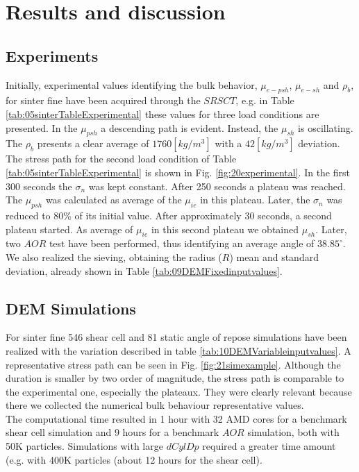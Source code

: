 \section{Results and discussion}
\label{sec:results}

\subsection{Experiments}
\label{subsec:experiments}

Initially, experimental values identifying the bulk behavior, $\mu_{e-psh}$, $\mu_{e-sh}$ and $\rho_{b}$, 
for sinter fine have been acquired through the $SRSCT$, e.g. in Table
\ref{tab:05sinterTableExperimental}
these values for three load conditions are presented.
In the $\mu_{psh}$ a descending path is evident. 
Instead, the $\mu_{sh}$ is oscillating.
The $\rho_b$ presents a clear average of $1760 [kg/m^3]$ with a $42 [kg/m^3]$
deviation.
The stress path for the second load condition of Table
\ref{tab:05sinterTableExperimental} is shown in Fig.
\ref{fig:20experimental}.
In the first 300 seconds the $\sigma_n$ was kept constant. After 250 seconds a
plateau was reached. 
The $\mu_{psh}$ was calculated as average of the $\mu_{ie}$ in this plateau.
Later, the $\sigma_n$ was reduced to $80 \%$ of its initial value.
After approximately 30 seconds, a second plateau started.
As average of $\mu_{ie}$ in this second plateau we obtained $\mu_{sh}$.
%
Later, two $AOR$ test have been performed, thus identifying an average angle of
$38.85 ^\circ$.
We also realized the sieving, obtaining the radius ($R$) mean and standard
deviation, already shown in Table \ref{tab:09DEMFixedinputvalues}.


\subsection{DEM Simulations}
\label{subsec:simulations}

For sinter fine 546 shear cell and 81 static angle of repose simulations have
been realized with the variation described in table
\ref{tab:10DEMVariableinputvalues}.
A representative stress path can be seen in Fig. \ref{fig:21simexample}.
Although the duration is smaller by two order of magnitude, the stress path is
comparable to the experimental one, especially the plateaux.
They were clearly relevant because there we collected the numerical bulk
behaviour representative values.\\
The computational time resulted in 1 hour with 32 AMD cores for a benchmark
shear cell simulation and 9 hours for a benchmark $AOR$ simulation, both with 50K particles. 
Simulations with large $dCylDp$ required a greater time amount (e.g. with 400K
particles (about 12 hours for the shear cell). \\


